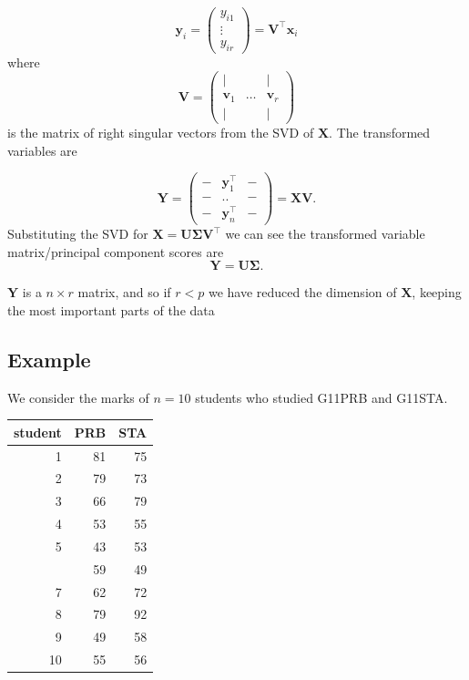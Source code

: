 \documentclass[]{book}
\theoremstyle{definition}
\theoremstyle{definition}
\theoremstyle{definition}
\theoremstyle{remark}
\begin{document}
\[\boldsymbol y_i= \left(\begin{array}{c}y_{i1}\\\vdots\\y_{ir}\end{array}\right)= \boldsymbol V^\top \boldsymbol x_i\]
where \[\boldsymbol V= \left(\begin{array}{ccc} | &&|\\\boldsymbol v_1&\ldots& \boldsymbol v_r\\  | &&|\end{array}\right)\]
is the matrix of right singular vectors from the SVD of \(\boldsymbol X\).
The transformed variables are

\[\boldsymbol Y= \left( \begin{array}{ccc}
- &\boldsymbol y_1^\top&-\\
- &..&-\\
- &\boldsymbol y_n^\top&-
\end{array}\right ) = \boldsymbol X\boldsymbol V.
\]
Substituting the SVD for \(\boldsymbol X= \boldsymbol U\boldsymbol \Sigma\boldsymbol V^\top\) we can see the transformed variable matrix/principal component scores are
\[\boldsymbol Y= \boldsymbol U\boldsymbol \Sigma.\]

\(\boldsymbol Y\) is a \(n \times r\) matrix, and so if \(r<p\) we have reduced the dimension of \(\boldsymbol X\), keeping the most important parts of the data

\hypertarget{example}{%
\subsection{Example}\label{example}}

We consider the marks of \(n=10\) students who studied G11PRB and G11STA.

\begin{table}[H]
\centering
\begin{tabular}{rrr}
\toprule
student & PRB & STA\\
\midrule
1 & 81 & 75\\
2 & 79 & 73\\
3 & 66 & 79\\
4 & 53 & 55\\
5 & 43 & 53\\
\addlinespace
6 & 59 & 49\\
7 & 62 & 72\\
8 & 79 & 92\\
9 & 49 & 58\\
10 & 55 & 56\\
\bottomrule
\end{tabular}
\end{table}
\end{document}
